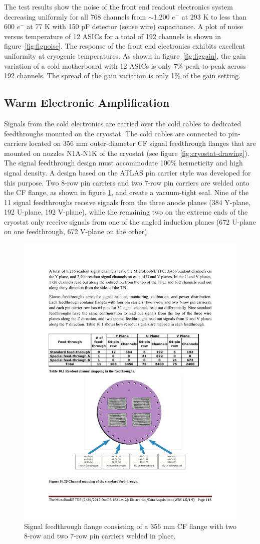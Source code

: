 The test results show the noise of the front end readout electronics system decreasing uniformly for all 768 channels from $\sim$1,200 $e^{-}$ at 293 K to less than 600 $e^{-}$ at 77 K with 150 pF detector (sense wire) capacitance. A plot of noise versus temperature of 12 ASICs for a total of 192 channels is shown in figure~\ref{fig:fignoise}. The response of the front end electronics exhibits excellent uniformity at cryogenic temperatures. As shown in figure~\ref{fig:figgain}, the gain variation of a cold motherboard with 12 ASICs is only 7\% peak-to-peak across 192 channels. The spread of the gain variation is only 1\% of the gain setting.

\subsection{Warm Electronic Amplification}
\label{sec:warmelectronics}
Signals from the cold electronics are carried over the cold cables to dedicated feedthroughs mounted on the cryostat.  The cold cables are connected to pin-carriers located on 356 mm outer-diameter CF signal feedthrough flanges that are mounted on nozzles N1A-N1K of the cryostat (see figure \ref{fig:cryostat-drawing}).  The signal feedthrough design must accommodate 100$\%$ hermeticity and high signal density. A design based on the ATLAS pin carrier style was developed for this purpose.  Two 8-row pin carriers and two 7-row pin carriers are welded onto the CF flange, as shown in figure \ref{fig:feedthroughflange}, and create a vacuum-tight seal.  Nine of the 11 signal feedthroughs receive signals from the three \lartpc anode planes (384 Y-plane, 192 U-plane, 192 V-plane), while the remaining two on the extreme ends of the cryostat only receive signals from one of the angled induction planes (672 U-plane on one feedthrough, 672 V-plane on the other).

\begin{figure}
\begin{center}
\includegraphics[width=0.6\linewidth]{figures/signal_feedthrough_standard.pdf}
\end{center}
\caption{\label{fig:feedthroughflange}Signal feedthrough flange consisting of a 356 mm CF flange with two 8-row and two 7-row pin carriers welded in place.}
\end{figure}

